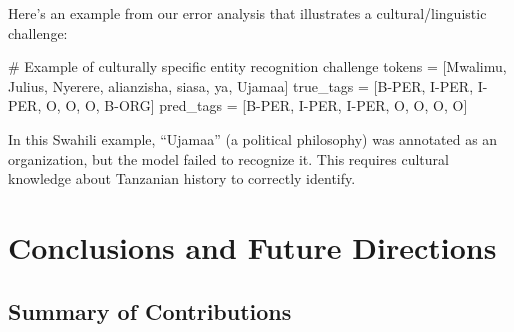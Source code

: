 \documentclass[
]{article}
\newenvironment{Shaded}{\begin{snugshade}}{\end{snugshade}}
\newcommand{\CommentTok}[1]{\textcolor[rgb]{0.37,0.37,0.37}{#1}}
\newcommand{\NormalTok}[1]{\textcolor[rgb]{0.00,0.23,0.31}{#1}}
\newcommand{\OperatorTok}[1]{\textcolor[rgb]{0.37,0.37,0.37}{#1}}
\newcommand{\StringTok}[1]{\textcolor[rgb]{0.13,0.47,0.30}{#1}}
\begin{document}
Here's an example from our error analysis that illustrates a
cultural/linguistic challenge:

\begin{Shaded}
\begin{Highlighting}[]
\CommentTok{\# Example of culturally specific entity recognition challenge}
\NormalTok{tokens }\OperatorTok{=}\NormalTok{ [}\StringTok{\textquotesingle{}Mwalimu\textquotesingle{}}\NormalTok{, }\StringTok{\textquotesingle{}Julius\textquotesingle{}}\NormalTok{, }\StringTok{\textquotesingle{}Nyerere\textquotesingle{}}\NormalTok{, }\StringTok{\textquotesingle{}alianzisha\textquotesingle{}}\NormalTok{, }\StringTok{\textquotesingle{}siasa\textquotesingle{}}\NormalTok{, }\StringTok{\textquotesingle{}ya\textquotesingle{}}\NormalTok{, }\StringTok{\textquotesingle{}Ujamaa\textquotesingle{}}\NormalTok{]}
\NormalTok{true\_tags }\OperatorTok{=}\NormalTok{ [}\StringTok{\textquotesingle{}B{-}PER\textquotesingle{}}\NormalTok{, }\StringTok{\textquotesingle{}I{-}PER\textquotesingle{}}\NormalTok{, }\StringTok{\textquotesingle{}I{-}PER\textquotesingle{}}\NormalTok{, }\StringTok{\textquotesingle{}O\textquotesingle{}}\NormalTok{, }\StringTok{\textquotesingle{}O\textquotesingle{}}\NormalTok{, }\StringTok{\textquotesingle{}O\textquotesingle{}}\NormalTok{, }\StringTok{\textquotesingle{}B{-}ORG\textquotesingle{}}\NormalTok{]}
\NormalTok{pred\_tags }\OperatorTok{=}\NormalTok{ [}\StringTok{\textquotesingle{}B{-}PER\textquotesingle{}}\NormalTok{, }\StringTok{\textquotesingle{}I{-}PER\textquotesingle{}}\NormalTok{, }\StringTok{\textquotesingle{}I{-}PER\textquotesingle{}}\NormalTok{, }\StringTok{\textquotesingle{}O\textquotesingle{}}\NormalTok{, }\StringTok{\textquotesingle{}O\textquotesingle{}}\NormalTok{, }\StringTok{\textquotesingle{}O\textquotesingle{}}\NormalTok{, }\StringTok{\textquotesingle{}O\textquotesingle{}}\NormalTok{]}
\end{Highlighting}
\end{Shaded}

In this Swahili example, ``Ujamaa'' (a political philosophy) was
annotated as an organization, but the model failed to recognize it. This
requires cultural knowledge about Tanzanian history to correctly
identify.

\section{Conclusions and Future
Directions}\label{conclusions-and-future-directions}

\subsection{Summary of Contributions}\label{summary-of-contributions}
\end{document}
